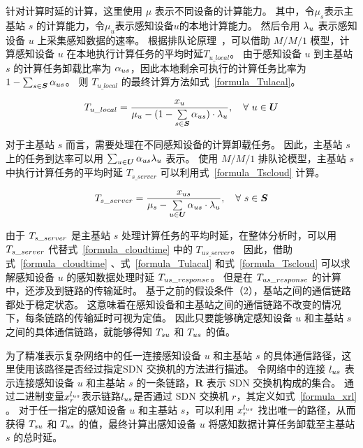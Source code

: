 针对计算时延的计算，这里使用 $\mu$ 表示不同设备的计算能力。
其中，令$\mu_s$表示主基站 $s$ 的计算能力，令$\mu_u$表示感知设备$u$的本地计算能力。
然后令用 ${\lambda}_{u}$ 表示感知设备 $u$ 上采集感知数据的速率。
根据排队论原理~\cite{Queueing:systems}，可以借助 $M/M/1$ 模型，计算感知设备 $u$ 在本地执行计算任务的平均时延$T_{u\_local}$。
由于感知设备 $u$ 到主基站 $s$ 的计算任务卸载比率为 ${\alpha}_{us}$，因此本地剩余可执行的计算任务比率为 $1 - \sum_{s \in \boldsymbol{S}}{\alpha}_{us}$。
则 $T_{u\_local}$ 的最终计算方法如式~\eqref{formula_Tulacal}。

\begin{equation}
  \label{formula_Tulacal}
  {T}_{u\_local} = \frac{{x}_{u}}{{\mu}_{u} - (1 - \sum\limits_{s \in \boldsymbol{S}} {\alpha}_{us}) \cdot {\lambda}_{u}}, \quad \forall \ u \in \boldsymbol{U}
\end{equation}

对于主基站 $s$ 而言，需要处理在不同感知设备的计算卸载任务。
因此，主基站 $s$ 上的任务到达率可以用 $\sum_{u \in \boldsymbol{U}} {\alpha}_{us} {\lambda}_{u}$ 表示。
使用 $M/M/1$ 排队论模型，主基站 $s$ 中执行计算任务的平均时延 $T_{s\_server}$ 可以利用式~\eqref{formula_Tscloud} 计算。

\begin{equation}
\label{formula_Tscloud}
{T}_{s\_server} = \frac{{x}_{us}}{{\mu}_{s} - \sum\limits_{u \in \boldsymbol{U}} {\alpha}_{us} \cdot {\lambda}_{u}}, \quad \forall \ s \in \boldsymbol{S}
\end{equation}

由于 ${T}_{s\_server}$ 是主基站 $s$ 处理计算任务的平均时延，在整体分析时，可以用 ${T}_{s\_server}$ 代替式~\eqref{formula_cloudtime} 中的 $T_{us\_server}$。
因此，借助式~\ref{formula_cloudtime} 、式~\ref{formula_Tulacal} 和式~\ref{formula_Tscloud} 可以求解感知设备 $u$ 的感知数据处理时延 ${T}_{us\_response}$。
但是在 ${T}_{us\_response}$ 的计算中，还涉及到链路的传输延时。
基于之前的假设条件（2），基站之间的通信链路都处于稳定状态。
这意味着在感知设备和主基站之间的通信链路不改变的情况下，每条链路的传输延时可视为定值。
因此只要能够确定感知设备 $u$ 和主基站 $s$ 之间的具体通信链路，就能够得知 ${T}_{su}$ 和 ${T}_{us}$ 的值。

为了精准表示复杂网络中的任一连接感知设备 $u$ 和主基站 $s$ 的具体通信路径，这里使用该路径是否经过指定SDN 交换机的方法进行描述。
令网络中的连接 $l_{us}$ 表示连接感知设备 $u$ 和主基站 $s$ 的一条链路，$\boldsymbol{R}$ 表示 SDN 交换机构成的集合。
通过二进制变量$x^{l_{us}}_{r}$表示链路$l_{us}$是否通过 SDN 交换机 $r$，其定义如式~\ref{formula_xrl} 。
对于任一指定的感知设备 $u$ 和主基站 $s$，可以利用 $x^{l_{us}}_{r}$ 找出唯一的路径，从而获得 ${T}_{su}$ 和 ${T}_{us}$ 的值，最终计算出感知设备 $u$ 将感知数据计算任务卸载至主基站 $s$ 的总时延。

